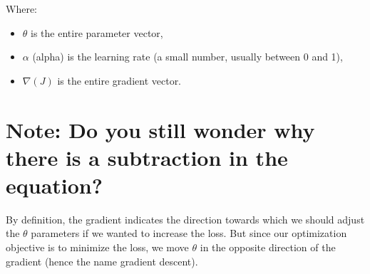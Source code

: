 Where:
\begin{itemize}
    \item $\theta$ is the entire parameter vector,
    \item $\alpha$ (alpha) is the learning rate (a small number, usually between 0 and 1),
    \item $\nabla{(J)}$ is the entire gradient vector.
\end{itemize}

\section*{Note: Do you still wonder why there is a subtraction in the equation?}

By definition, the gradient indicates the direction towards which we 
should adjust the $\theta$ parameters if we wanted to increase the loss. 
But since our optimization objective is to minimize the loss,
we move $\theta$ in the opposite direction of the gradient 
(hence the name gradient descent).
